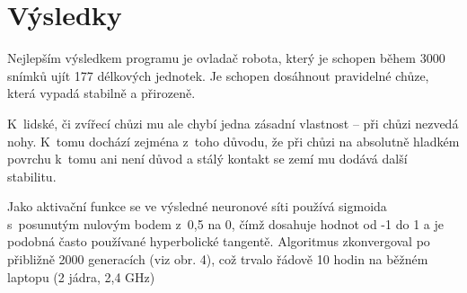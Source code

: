 \documentclass[a4]{article}
\begin{document}
\section{Výsledky}
Nejlepším výsledkem programu je ovladač robota, který je schopen během 3000 snímků ujít 177 délkových jednotek. Je schopen dosáhnout pravidelné chůze, která vypadá stabilně a přirozeně.\par 
K~lidské, či zvířecí chůzi mu ale chybí jedna zásadní vlastnost -- při chůzi nezvedá nohy. K~tomu dochází zejména z~toho důvodu, že při chůzi na absolutně hladkém povrchu k~tomu ani není důvod a stálý kontakt se zemí mu dodává další stabilitu.\par
Jako aktivační funkce se ve výsledné neuronové síti používá sigmoida s~posunutým nulovým bodem z~0,5 na 0, čímž dosahuje hodnot od -1 do 1 a je podobná často používané hyperbolické tangentě.
Algoritmus zkonvergoval po přibližně 2000 generacích (viz obr. 4), což trvalo řádově 10 hodin na běžném laptopu (2 jádra, 2,4 GHz)
\end{document}
